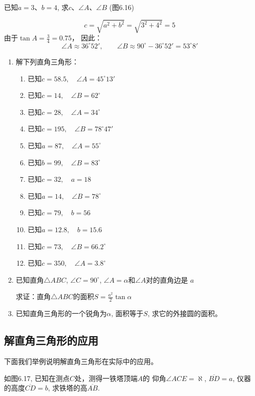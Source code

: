 \begin{example}
    已知$a=3$、$b=4$, 求$c$、$\angle A$、$\angle B$ (图6.16)
\end{example}

\begin{solution}
\[c=\sqrt{a^2+b^2}=\sqrt{3^2+4^2}=5\]
由于$\tan A=\frac{3}{4}=0.75$，
因此：$$\angle A\approx 36^{\circ} 52',\qquad 
\angle B\approx 90^{\circ} -36^{\circ} 52'=53^{\circ} 8'$$ 
\end{solution}

\begin{ex}
\begin{enumerate}
    \item 解下列直角三角形：
    \begin{enumerate}
    \item 已知$c=58.5,\quad \angle A=45^{\circ} 13'$
    \item 已知$c=14,\quad \angle B=62^{\circ}$
    \item 已知$c=28,\quad \angle A=34^{\circ} $
    \item 已知$c=195,\quad \angle B=78^{\circ} 47'$
    \item 已知$a=87,\quad \angle A=55^{\circ} $
    \item 已知$b=99,\quad \angle B=83^{\circ} $
    \item 已知$c=32,\quad a=18$
    \item 已知$a=14,\quad \angle B=78^{\circ}$
    \item 已知$c=79,\quad b=56$
    \item 已知$a=12.8,\quad b=15.6$
    \item 已知$c=73,\quad \angle B=66.2^{\circ}$ 
    \item 已知$c=350,\quad \angle A=3.8^{\circ} $
\end{enumerate}

\item 已知直角$\triangle ABC$, $\angle C=90^{\circ}$, $\angle A=\alpha$和$\angle A$对的直角边是
$a$

求证：直角$\triangle ABC$的面积$S=\frac{a^2}{2}\tan\alpha$

\item  已知直角三角形的一个锐角为$\alpha$, 面积等于$S$, 
求它的外接圆的面积。
\end{enumerate}
\end{ex}

\subsection{解直角三角形的应用}
下面我们举例说明解直角三角形在实际中的应用。
\begin{example}
如图6.17, 已知在测点$C$处，测得一铁塔顶端$A$的
仰角$\angle ACE=\aleph$, $\overline{BD}=a$, 仪器的高度$\overline{CD}=b$, 求铁塔的高$\overline{AB}$.

\end{example}



